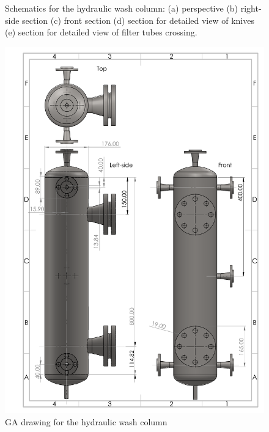 \begin{figure}[h]
    \centering
    
    \caption{Schematics for the hydraulic wash column: (a) perspective (b) right-side section (c) front section (d) section for detailed view of knives (e) section for detailed view of filter tubes crossing.}
    \label{fig:wash column schematic}
\end{figure}

\begin{figure}[h]
    \centering
    \includegraphics[scale=0.4]{chapters/3-separation/figures/Hydraulic_Wash_Column_GA.PDF}
    \caption{GA drawing for the hydraulic wash column}
    \label{fig:wash column GA}
\end{figure} 








